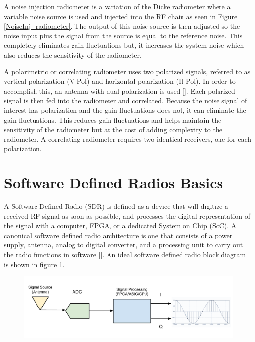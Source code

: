 A noise injection radiometer is a variation of the Dicke radiometer where a variable noise source is used and injected into the RF chain as seen in Figure \ref{NoiseInj_radiometer}.  The output of this noise source is then adjusted so the noise input plus the signal from the source is equal to the reference noise.  This completely eliminates gain fluctuations but, it increases the system noise which also reduces the sensitivity of the radiometer.

A polarimetric or correlating radiometer uses two polarized signals, referred to as vertical polarization (V-Pol) and horizontal polarization (H-Pol).  In order to accomplish this, an antenna with dual polarization is used [\cite{Fujimoto}].  Each polarized signal is then fed into the radiometer and correlated.  Because the noise signal of interest has polarization and the gain fluctuations does not, it can eliminate the gain fluctuations.  This reduces gain fluctuations and helps maintain the sensitivity of the radiometer but at the cost of adding complexity to the radiometer. A correlating radiometer requires two identical receivers, one for each polarization. 




 
\section{Software Defined Radios Basics} 
A Software Defined Radio (SDR) is defined as a device that will digitize a received RF signal as soon as possible, and processes the digital representation of the signal with a computer, FPGA, or a dedicated System on Chip (SoC).  A canonical software defined radio architecture is one that consists of a power supply, antenna, analog to digital converter, and a processing unit to carry out the radio functions in software [\cite{Mitola1995}]. An ideal software defined radio block diagram is shown in figure \ref{ideal_sdr}.

{\begin{figure}[h!tb] 
\centering
\includegraphics[width=\textwidth]{Images/SDR_Ideal_block.pdf}
\label{ideal_sdr}
\end{figure}
}


